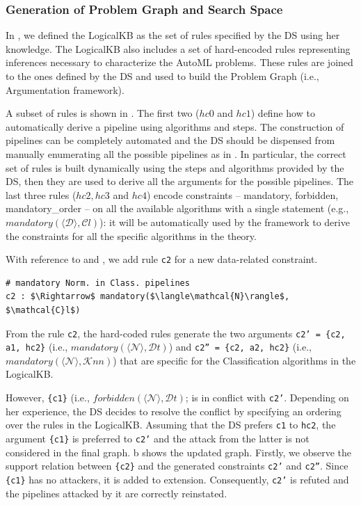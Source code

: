 \subsubsection{Generation of Problem Graph and Search Space}
In , we defined the LogicalKB as the set of rules specified by the DS using her knowledge.
The LogicalKB also includes a set of hard-encoded rules representing inferences necessary to characterize the AutoML problems.
These rules are joined to the ones defined by the DS and used to build the Problem Graph (i.e., Argumentation framework).

A subset of rules is shown in .
The first two ($hc0$ and $hc1$) define how to automatically derive a pipeline using algorithms and steps.
The construction of pipelines can be completely automated and the DS should be dispensed from manually enumerating all the possible pipelines as in .
In particular, the correct set of rules is built dynamically using the steps and algorithms provided by the DS, then they are used to derive all the arguments for the possible pipelines.
The last three rules ($hc2, hc3$ and $hc4$) encode constraints -- mandatory, forbidden, mandatory\_order -- on all the available algorithms with a single statement (e.g., $mandatory(\langle \mathcal{D} \rangle, \mathcal{C}l)$): it will be automatically used by the framework to derive the constraints for all the specific algorithms in the theory.

\begin{example}
With reference to  and , we add rule \texttt{c2} for a new data-related constraint.
\begin{lstlisting}[mathescape=true]
# mandatory Norm. in Class. pipelines
c2 : $\Rightarrow$ mandatory($\langle\mathcal{N}\rangle$, $\mathcal{C}l$)
\end{lstlisting}
From the rule \texttt{c2}, the hard-coded rules generate the two arguments
\texttt{c2' = \{c2, a1, hc2\}} (i.e., $mandatory(\langle\mathcal{N}\rangle, \mathcal{D}t)$) and \texttt{c2'' = \{c2, a2, hc2\}} (i.e., $mandatory(\langle\mathcal{N}\rangle, \mathcal{K}nn)$) that are specific for the Classification algorithms in the LogicalKB.

However, \texttt{\{c1\}} (i.e., $forbidden(\langle\mathcal{N}\rangle, \mathcal{D}t)$; is in conflict with \texttt{c2'}.
Depending on her experience, the DS decides to resolve the conflict by specifying an ordering over the rules in the LogicalKB.
Assuming that the DS prefers \texttt{c1} to \texttt{hc2},
the argument \texttt{\{c1\}} is preferred to \texttt{c2'} and the attack from the latter is not considered in the final graph.
b shows the updated graph.
Firstly, we observe the support relation between \texttt{\{c2\}} and the generated constraints \texttt{c2'} and \texttt{c2''}.
Since \texttt{\{c1\}} has no attackers, it is added to extension.
Consequently, \texttt{c2'} is refuted and the pipelines attacked by it are correctly reinstated.
\label{ex:hard_coded_rules}
\end{example}

